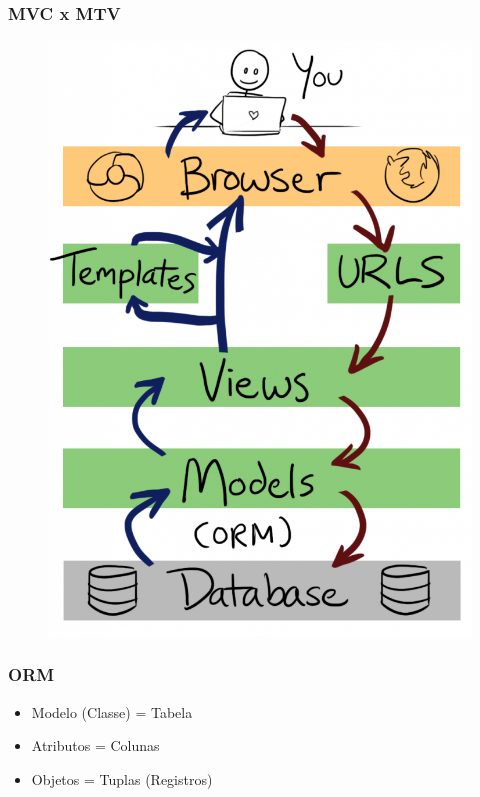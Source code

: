 \documentclass[aspectratio=169]{beamer}
\begin{document}
\begin{frame}\frametitle{MVC x MTV}
	\begin{figure}[h]
	  \centering
  		\includegraphics[height=.9\paperheight]{img/mtv2.png}
	\end{figure}
\end{frame}


\begin{frame}\frametitle{ORM}

\begin{itemize}
	\item Modelo (Classe) = Tabela
	\item Atributos = Colunas
	\item Objetos = Tuplas (Registros)
\end{itemize}

\end{frame}
\end{document}
